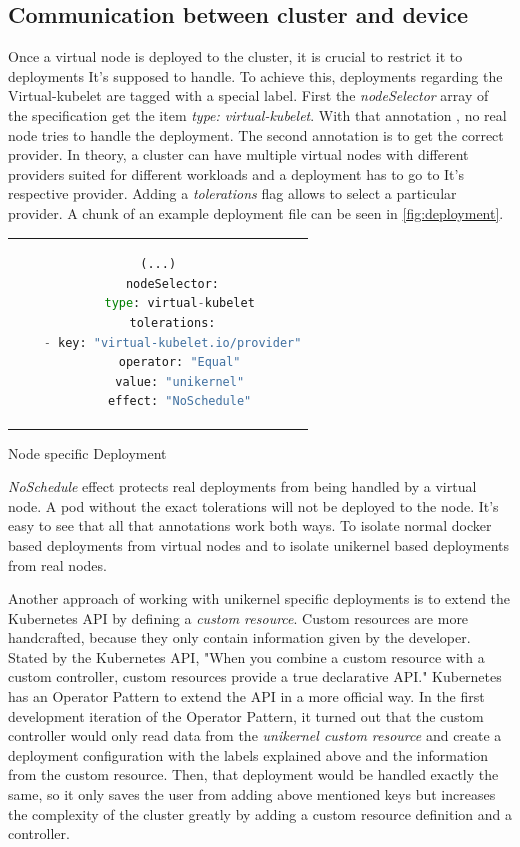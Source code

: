 \subsection{Communication between cluster and device}
Once a virtual node is deployed to the cluster, it is crucial to restrict it to deployments It's supposed to handle. To achieve this, deployments regarding the Virtual-kubelet are tagged with a special label. First the \textit{nodeSelector} array of the specification get the item \textit{type: virtual-kubelet}. With that annotation , no real node tries to handle the deployment. The second annotation is to get the correct provider. In theory, a cluster can have multiple virtual nodes with different providers suited for different workloads and a deployment has to go to It's respective provider. Adding a \textit{tolerations} flag allows to select a particular provider. A chunk of an example deployment file can be seen in \ref{fig:deployment}.

\begin{code}[htpb]
  \centering
  \begin{tabular}{c}
  \begin{lstlisting}[language=python]
    (...)
    nodeSelector:
      type: virtual-kubelet
    tolerations:
    - key: "virtual-kubelet.io/provider"
      operator: "Equal"
      value: "unikernel"
      effect: "NoSchedule"
\end{lstlisting}
\end{tabular}
\caption{Node specific Deployment}\label{fig:deployment}
\end{code}
\textit{NoSchedule} effect protects real deployments from being handled by a virtual node. A pod without the exact tolerations will not be deployed to the node. It's easy to see that all that annotations work both ways. To isolate normal docker based deployments from virtual nodes and to isolate unikernel based deployments from real nodes.

Another approach of working with unikernel specific deployments is to extend the Kubernetes API by defining a \textit{custom resource}. Custom resources are more handcrafted, because they only contain information given by the developer. Stated by the Kubernetes API, "When you combine a custom resource with a custom controller, custom resources provide a true declarative API." Kubernetes has an Operator Pattern to extend the API in a more official way. In the first development iteration of the Operator Pattern, it turned out that the custom controller would only read data from the \textit{unikernel custom resource} and create a deployment configuration with the labels explained above and the information from the custom resource. Then, that deployment would be handled exactly the same, so it only saves the user from adding above mentioned keys but increases the complexity of the cluster greatly by adding a custom resource definition and a controller.

